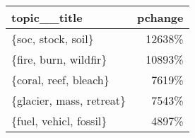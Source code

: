 \begin{tabular}{p{1.2cm}r}
\toprule
             topic\_\_title &  pchange \\
\midrule
       \{soc, stock, soil\} &   12638\% \\
    \{fire, burn, wildfir\} &   10893\% \\
    \{coral, reef, bleach\} &    7619\% \\
 \{glacier, mass, retreat\} &    7543\% \\
   \{fuel, vehicl, fossil\} &    4897\% \\
\bottomrule
\end{tabular}
